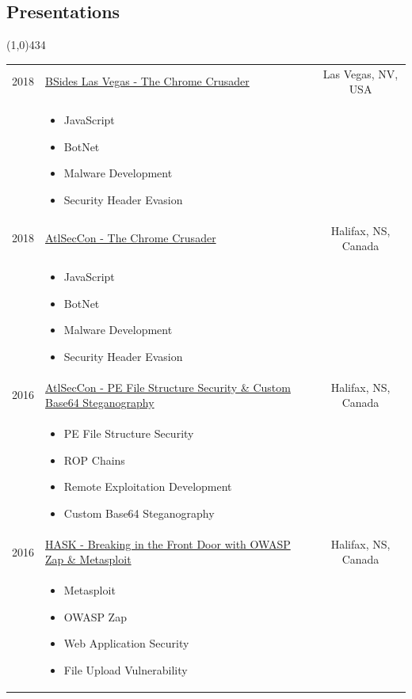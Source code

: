 \documentclass{res}
\newcommand{\frstCVcell}{2.5cm}
\begin{document}
\begin{resume}
  \section{Presentations}
  \line(1,0){434}
  \newline
  \newline
  \begin{tabularx}{\textwidth}{p{\frstCVcell}Xc}
    2018 & \href{https://speakerdeck.com/lillypad/the-chrome-crusader}{BSides Las Vegas - The Chrome Crusader} & Las Vegas, NV, USA\\
    &
    \begin{itemize}
    \item JavaScript
    \item BotNet
    \item Malware Development
    \item Security Header Evasion
    \end{itemize}
    & \\
    2018 & \href{https://speakerdeck.com/lillypad/the-chrome-crusader}{AtlSecCon - The Chrome Crusader} & Halifax, NS, Canada\\
    &
    \begin{itemize}
    \item JavaScript
    \item BotNet
    \item Malware Development
    \item Security Header Evasion
    \end{itemize}
    & \\
    2016 & \href{https://speakerdeck.com/lillypad/pe-file-structure-security-and-custom-base-64-steganography}{AtlSecCon - PE File Structure Security \& Custom Base64 Steganography} & Halifax, NS, Canada\\
    &
    \begin{itemize}
    \item PE File Structure Security
    \item ROP Chains
    \item Remote Exploitation Development
    \item Custom Base64 Steganography
    \end{itemize}
    & \\
    2016 & \href{https://speakerdeck.com/lillypad/breaking-in-the-front-door-with-owasp-zap-and-metasploit}{HASK - Breaking in the Front Door with OWASP Zap \& Metasploit} & Halifax, NS, Canada\\
    &
    \begin{itemize}
    \item Metasploit
    \item OWASP Zap
    \item Web Application Security
    \item File Upload Vulnerability
    \end{itemize}
    & \\
  \end{tabularx}
  

\end{resume}
\end{document}
